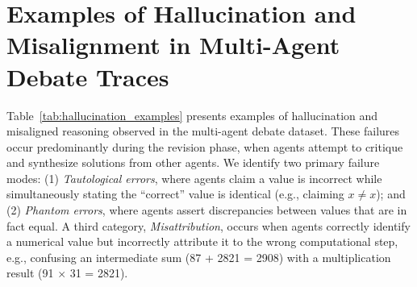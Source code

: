 \section{Examples of Hallucination and Misalignment in Multi-Agent Debate Traces}\label{app:hallucination}
Table~\ref{tab:hallucination_examples} presents examples of hallucination and misaligned reasoning observed in the multi-agent debate dataset. These failures occur predominantly during the revision phase, when agents attempt to critique and synthesize solutions from other agents. We identify two primary failure modes: (1) \textit{Tautological errors}, where agents claim a value is incorrect while simultaneously stating the ``correct'' value is identical (e.g., claiming $x \neq x$); and (2) \textit{Phantom errors}, where agents assert discrepancies between values that are in fact equal. A third category, \textit{Misattribution}, occurs when agents correctly identify a numerical value but incorrectly attribute it to the wrong computational step, e.g., confusing an intermediate sum (87 + 2821 = 2908) with a multiplication result (91 $\times$ 31 = 2821).


